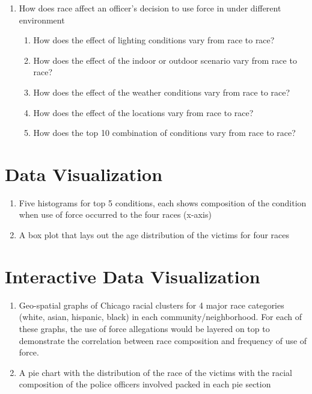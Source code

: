 \documentclass[10pt]{article}
\begin{document}
\begin{enumerate}
\item How does race affect an officer's decision to use force in under different environment

    \begin{enumerate}

    \item How does the effect of lighting conditions vary from race to race?

    \item How does the effect of the indoor or outdoor scenario vary from race to race?

    \item How does the effect of the weather conditions vary from race to race?

    \item How does the effect of the locations vary from race to race?

    \item How does the top 10 combination of conditions vary from race to race?

    \end{enumerate}

\end{enumerate}





\section{Data Visualization}

\begin{enumerate}

\item Five histograms for top 5 conditions, each shows composition of the condition when use of force occurred to the four races (x-axis)

\item A box plot that lays out the age distribution of the victims for four races

\end{enumerate}



\section{Interactive Data Visualization}

\begin{enumerate}

\item Geo-spatial graphs of Chicago racial clusters for 4 major race categories (white, asian, hispanic, black) in each community/neighborhood. For each of these graphs, the use of force allegations would be layered on top to demonstrate the correlation between race composition and frequency of use of force.

\item A pie chart with the distribution of the race of the victims with the racial composition of the police officers involved packed in each pie section

\end{enumerate}
\end{document}
